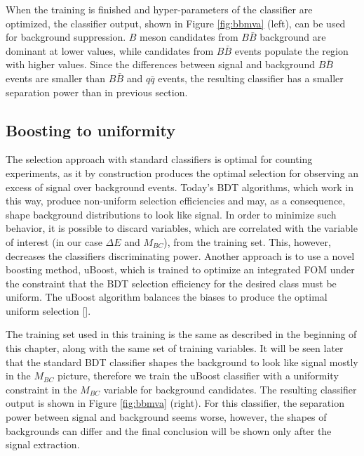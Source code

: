 \documentclass[  headings=standardclasses,
  headings=big,oneside,a4paper,openany,12pt]{scrbook}
\begin{document}
When the training is finished and hyper-parameters of the classifier are optimized, the classifier output, shown in Figure \ref{fig:bbmva} (left), can be used for background suppression. $B$ meson candidates from $B \bar B$ background are dominant at lower values, while candidates from $B \bar B$ events populate the region with higher values. Since the differences between signal and background $B \bar B$ events are smaller than $B \bar B$ and $q \bar q$ events, the resulting classifier has a smaller separation power than in previous section.

\subsection{Boosting to uniformity}
The selection approach with standard classifiers is optimal for counting experiments, as it by construction produces the optimal selection for observing an excess of signal over background events. Today's BDT algorithms, which work in this way, produce non-uniform selection efficiencies and may, as a consequence, shape background distributions to look like signal. In order to minimize such behavior, it is possible to discard variables, which are correlated with the variable of interest (in our case $\Delta E$ and $M_{BC}$), from the training set. This, however, decreases the classifiers discriminating power. Another approach is to use a novel boosting method, uBoost, which is trained to optimize an integrated FOM under the constraint that the BDT selection efficiency for the desired class must be uniform. The uBoost algorithm balances the biases to produce the optimal uniform selection [].

The training set used in this training is the same as described in the beginning of this chapter, along with the same set of training variables. It will be seen later that the standard BDT classifier shapes the background to look like signal mostly in the $M_{BC}$ picture, therefore we train the uBoost classifier with a uniformity constraint in the $M_{BC}$ variable for background candidates. The resulting classifier output is shown in Figure \ref{fig:bbmva} (right). For this classifier, the separation power between signal and background seems worse, however, the shapes of backgrounds can differ and the final conclusion will be shown only after the signal extraction.
\end{document}
